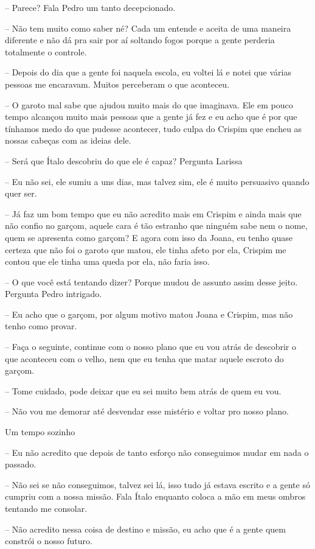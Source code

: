 -- Parece? Fala Pedro um tanto decepcionado.

-- Não tem muito como saber né? Cada um entende e aceita de uma maneira diferente e não dá pra sair por aí soltando fogos porque a gente perderia totalmente o controle.

-- Depois do dia que a gente foi naquela escola, eu voltei lá e notei que várias pessoas me encaravam. Muitos perceberam o que aconteceu.

-- O garoto mal sabe que ajudou muito mais do que imaginava. Ele em pouco tempo alcançou muito mais pessoas que a gente já fez e eu acho que é por que tínhamos medo do que pudesse acontecer, tudo culpa do Crispim que encheu as nossas cabeças com as ideias dele.

-- Será que Ítalo descobriu do que ele é capaz? Pergunta Larissa

-- Eu não sei, ele sumiu a uns dias, mas talvez sim, ele é muito persuasivo quando quer ser.

-- Já faz um bom tempo que eu não acredito mais em Crispim e ainda mais que não confio no garçom, aquele cara é tão estranho que ninguém sabe nem o nome, quem se apresenta como garçom? E agora com isso da Joana, eu tenho quase certeza que não foi o garoto que matou, ele tinha afeto por ela, Crispim me contou que ele tinha uma queda por ela, não faria isso.

-- O que você está tentando dizer? Porque mudou de assunto assim desse jeito. Pergunta Pedro intrigado.

-- Eu acho que o garçom, por algum motivo matou Joana e Crispim, mas não tenho como provar.

-- Faça o seguinte, continue com o nosso plano que eu vou atrás de descobrir o que aconteceu com o velho, nem que eu tenha que matar aquele escroto do garçom.

-- Tome cuidado, pode deixar que eu sei muito bem atrás de quem eu vou.

-- Não vou me demorar até desvendar esse mistério e voltar pro nosso plano.


Um tempo sozinho


-- Eu não acredito que depois de tanto esforço não conseguimos mudar em nada o passado.

-- Não sei se não conseguimos, talvez sei lá, isso tudo já estava escrito e a gente só cumpriu com a nossa missão. Fala Ítalo enquanto coloca a mão em meus ombros tentando me consolar.

-- Não acredito nessa coisa de destino e missão, eu acho que é a gente quem constrói o nosso futuro.

